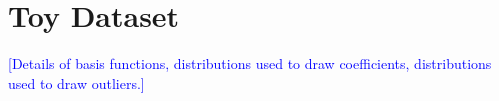 \documentclass[onecolumn,floatfix]{aastex631}
\newcommand{\placeholder}[1]{\textcolor{blue}{[#1]}}
\begin{document}

\section{Toy Dataset} \label{sec:toy_model_details}

\placeholder{Details of basis functions, distributions used to draw coefficients, distributions used to draw outliers.}

\raggedright\footnotesize


\end{document}
